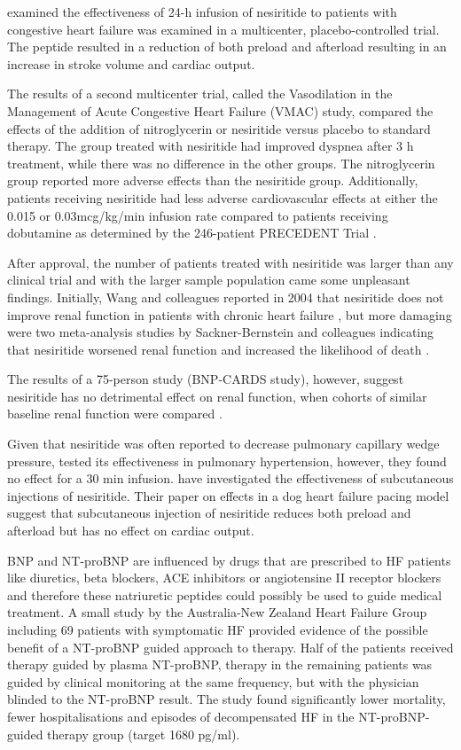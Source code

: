 \documentclass[14pt,a4paper,onecolumn]{extarticle}
\begin{document}
\citep{Mills1999} examined the effectiveness of 24-h infusion of nesiritide to patients with congestive heart failure was examined in a multicenter, placebo-controlled trial. The peptide resulted in a reduction of both preload and afterload resulting in an increase in stroke volume and cardiac output.

The results of a second multicenter trial, called the Vasodilation in the Management of Acute Congestive Heart Failure (VMAC) study, compared the effects of the addition of nitroglycerin or nesiritide versus placebo to standard therapy. The group treated with nesiritide had improved dyspnea after 3 h treatment, while there was no difference in the other groups. The nitroglycerin group reported more adverse effects than the nesiritide group. Additionally, patients receiving nesiritide had less adverse cardiovascular effects at either the 0.015 or 0.03mcg/kg/min infusion rate compared to patients receiving dobutamine as determined by the 246-patient PRECEDENT Trial \citep{deLissovoy2003}.

After approval, the number of patients treated with nesiritide was larger than any clinical trial and with the larger sample population came some unpleasant findings. Initially, Wang and colleagues reported in 2004 that nesiritide does not improve renal function in patients with chronic heart failure \citep{Wang2004a}, but more damaging were two meta-analysis studies by Sackner-Bernstein and colleagues indicating that nesiritide worsened renal function and increased the likelihood of death \citep{Sackner-Bernstein2005a} \citep{Sackner-Bernstein2005b}.

The results of a 75-person study (BNP-CARDS study), however, suggest nesiritide has no detrimental effect on renal function, when cohorts of similar baseline renal function were compared \citep{Witteles2007}.

Given that nesiritide was often reported to decrease pulmonary capillary wedge pressure, \citep{Michaels2005} tested its effectiveness in pulmonary hypertension, however, they found no effect for a 30 min infusion. \citep{Chen2006} have investigated the effectiveness of subcutaneous injections of nesiritide. Their paper on effects in a dog heart failure pacing model suggest that subcutaneous injection of nesiritide reduces both preload and afterload but has no effect on cardiac output.

BNP and NT-proBNP are influenced by drugs that are prescribed to HF patients like diuretics, beta blockers, ACE inhibitors or angiotensine II receptor blockers and therefore these natriuretic peptides could possibly be used to guide medical treatment. A small study by the Australia-New Zealand Heart Failure Group including 69 patients with symptomatic HF provided evidence of the possible benefit of a NT-proBNP guided approach to therapy. Half of the patients received therapy guided by plasma NT-proBNP, therapy in the remaining patients was guided by clinical monitoring at the same frequency, but with the physician blinded to the NT-proBNP result.  The study found significantly lower mortality, fewer hospitalisations and episodes of decompensated HF in the NT-proBNP-guided therapy group (target 1680 pg/ml). \citep{Troughton2000}
\end{document}
